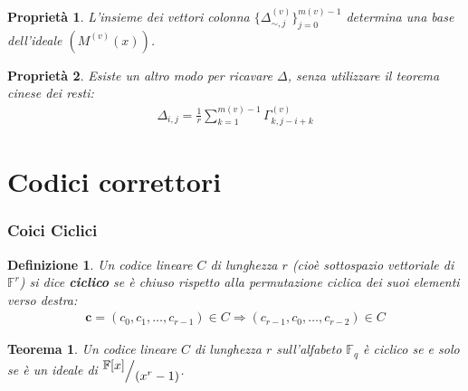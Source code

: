 \documentclass[mathserif]{beamer}
\def\quotient#1#2{%
   \raise1ex\hbox{$#1$}\Big/\lower1ex\hbox{$#2$}%
}
\newtheorem{definizione}{Definizione}
\newtheorem{teorema}{Teorema}
\newtheorem{prop}{Proprietà}
\begin{document}
\begin{frame}
    \begin{prop}
      L'insieme dei vettori colonna $\lbrace \Delta_{\sim, j}^{(v)} \rbrace_{j=0}^{m(v)-1}$ determina una base dell'ideale $(M^{(v)}(x))$.
    \end{prop}
    \begin{prop}
	Esiste un altro modo per ricavare $\Delta$, senza utilizzare il teorema cinese dei resti: 
	\begin{align*}
	  \Delta_{i,j} = \frac{1}{r} \sum_{k=1}^{m(v)-1} \Gamma_{k,j-i+k}^{(v)}
	\end{align*}
    \end{prop}
\end{frame}


\section{Codici correttori}
\begin{frame}
  \frametitle{Coici Ciclici} 
    \begin{definizione}
    Un codice lineare $C$ di lunghezza $r$ (cioè sottospazio vettoriale di $\mathbb{F}^{r}$) si dice {\bf ciclico} se è chiuso rispetto alla permutazione ciclica dei suoi elementi verso destra:
    \begin{align*}
	\mathbf{c} = (c_{0},c_{1}, \dots , c_{r-1}) \in C \Longrightarrow (c_{r-1},c_{0}, \dots , c_{r-2}) \in C 
    \end{align*}
    \end{definizione}
    \begin{teorema}
      Un codice lineare $C$ di lunghezza $r$ sull'alfabeto $\mathbb{F}_{q}$ è ciclico se e solo se è un ideale di $\quotient{\mathbb{F} \lbrack x \rbrack  }{ (x^{r} - 1)}$. 
    \end{teorema}
\end{frame}

\end{document}
